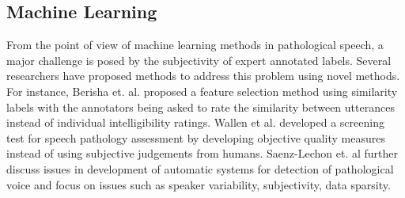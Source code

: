 \documentclass{article}
\begin{document}
\subsection{Machine Learning}
From the point of view of machine learning methods in pathological speech, a major challenge is posed by the subjectivity of expert annotated labels.
Several researchers have proposed methods to address this problem using novel methods.
For instance, Berisha et. al. \cite{berisha2014modeling} proposed a feature selection method using similarity labels with the annotators being asked to rate the similarity between utterances instead of individual intelligibility ratings. 
Wallen et al. \cite{wallen1996screening} developed a screening test for speech pathology assessment by developing objective quality measures instead of using subjective judgements from humans.
Saenz-Lechon et. al \cite{saenz2006methodological} further discuss issues in development of automatic systems for detection of pathological voice and focus on issues such as speaker variability, subjectivity, data sparsity.
\end{document}
